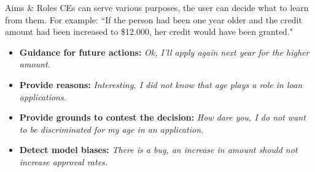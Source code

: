 \documentclass[aspectratio=169]{../latex_main/tntbeamer}  %
\begin{document}
\begin{frame}{Aims \& Roles}
	CEs can serve various purposes, the user can decide what to learn from them. For example:\newline
	``If the person had been one year older and the credit amount had been increased to \$12.000, her credit would have been granted."  \\[0.2cm]
	\begin{itemize}
		\itemsep1.3em
		\pause
		\item \textbf{Guidance for future actions:} \textit{Ok, I'll apply again next year for the higher amount.}
		\pause
		\item \textbf{Provide reasons:} \textit{Interesting, I did not know that age plays a role in loan applications.}
		\pause
		\item \textbf{Provide grounds to contest the decision:} \textit{How dare you, I do not want to be discriminated for my age in an application.}
		\pause
		\item \textbf{Detect model biases:} \textit{There is a bug, an increase in amount should not increase approval rates.}
	\end{itemize}
\end{frame}

\end{document}

